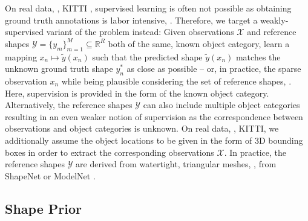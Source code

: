 On real data, \eg, KITTI \citep{Geiger2012CVPR}, supervised learning is often not possible as obtaining ground truth annotations is labor intensive, \cf \citep{Menze2015CVPR,Xie2016CVPR}. Therefore, we target a weakly-supervised variant of the problem instead: Given observations $\mathcal{X}$ and reference shapes $\mathcal{Y} = \{y_m\}_{m = 1}^M \subseteq \mathbb{R}^R$ both of the same, known object category, learn a mapping $x_n \mapsto \tilde{y}(x_n)$ such that the predicted shape $\tilde{y}(x_n)$ matches the unknown ground truth shape $y_n^*$ as close as possible -- or, in practice, the sparse observation $x_n$ while being plausible considering the set of reference shapes, \cf {}. Here, supervision is provided in the form of the known object category. Alternatively, the reference shapes $\mathcal{Y}$ can also include multiple object categories resulting in an even weaker notion of supervision as the correspondence between observations and object categories is unknown.  On real data, \eg, KITTI, we additionally assume the object locations to be given in the form of 3D bounding boxes in order to extract the corresponding observations $\mathcal{X}$. In practice, the reference shapes $\mathcal{Y}$ are derived from watertight, triangular meshes, \eg, from ShapeNet \citep{Chang2015ARXIV} or ModelNet \citep{Wu2015CVPR}.

\subsection{Shape Prior}
\label{subsec:method-prior}


